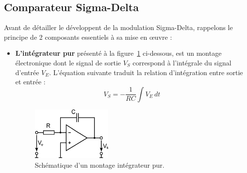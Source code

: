 \documentclass[10pt, oneside, a4paper]{article}
\begin{document}
\subsection{Comparateur Sigma-Delta}
\label{subsec:sigma_delta}

Avant de détailler le développent de la modulation Sigma-Delta, rappelons le principe de 2 composants essentiels à sa mise en œuvre : 
\begin{itemize}
\item \noindent\textbf{L'intégrateur pur} présenté à la figure~\ref{fig:IntegPur} ci-dessous, est un montage électronique dont le signal de sortie $V_{S}$ correspond à l'intégrale du signal d'entrée $V_{E}$.
L'équation suivante traduit la relation d'intégration entre sortie et entrée :
\begin{equation}
    V_{S} = -\frac{1}{RC}\int V_{E}\,dt
    \label{eqn:integrator}
\end{equation}
\begin{figure}[!ht]
    \centering
    \includegraphics[width=4cm]{eps/integrateur.eps}
    \caption{Schématique d'un montage intégrateur pur.}
    \label{fig:IntegPur}
\end{figure}


\end{itemize}
\end{document}
